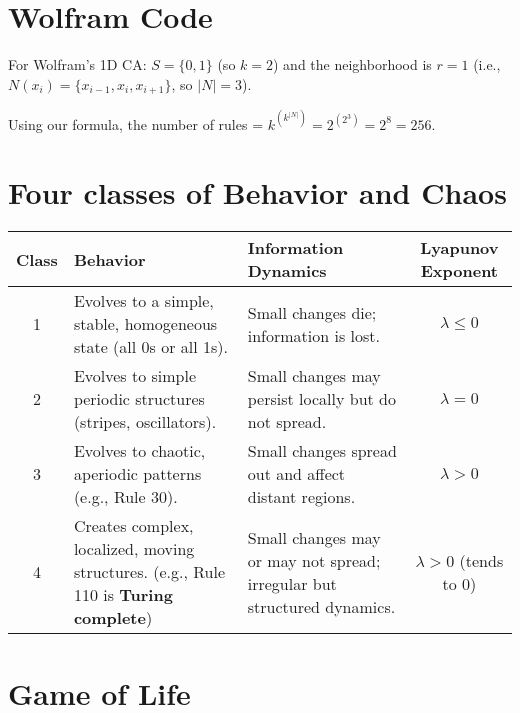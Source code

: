 \section*{Wolfram Code}

For Wolfram's 1D CA: $S = \{0, 1\}$ (so $k=2$) and the neighborhood is $r=1$ (i.e., $N(x_i) = \{x_{i-1}, x_i, x_{i+1}\}$, so $|N|=3$).

Using our formula, the number of rules = $k^{\left(k^{|N|}\right)} = 2^{\left(2^3\right)} = 2^8 = 256$.


\section*{Four classes of Behavior and Chaos}

\renewcommand{\arraystretch}{1.3}
\begin{table}[h!]
\centering
\begin{tabular}{|c|p{4cm}|p{4cm}|c|}
\hline
\textbf{Class} & \textbf{Behavior} & \textbf{Information Dynamics} & \textbf{Lyapunov Exponent} \\
\hline
1 & Evolves to a simple, stable, homogeneous state (all 0s or all 1s). & Small changes die; information is lost. & $\lambda \le 0$ \\
\hline
2 & Evolves to simple periodic structures (stripes, oscillators). & Small changes may persist locally but do not spread. & $\lambda = 0$ \\
\hline
3 & Evolves to chaotic, aperiodic patterns (e.g., Rule 30). & Small changes spread out and affect distant regions. & $\lambda > 0$ \\
\hline
4 & Creates complex, localized, moving structures. (e.g., Rule 110 is \textbf{Turing complete}) & Small changes may or may not spread; irregular but structured dynamics. & $\lambda > 0$ (tends to 0) \\
\hline
\end{tabular}
\end{table}

\section*{Game of Life}

